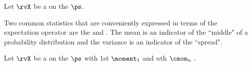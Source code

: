 \begin{definition}
\label{def:moment}
\label{def:cmom}
Let $\rvX$ be a  on the  $\ps$.
\end{definition}

Two common statistics that are conveniently expressed in terms of the
expectation operator are the  and .
The mean is an indicator of the ``middle" of a probability distribution and the
variance is an indicator of the ``spread".
\begin{definition}
\label{def:mean}
\label{def:pvar}
\label{def:pVar}
\label{def:skewness}
\label{def:kurtosis}
Let $\rvX$ be a  on the  $\ps$
with 1st  $\moment_1$ and $n$th  $\cmom_n$ .
\end{definition}

